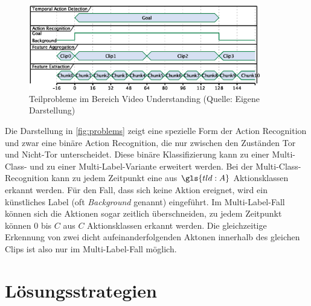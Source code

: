 \begin{figure}[htbp]
    \centering
    \includegraphics[width=0.9\textwidth, height=0.9\textwidth, keepaspectratio, interpolate]{fig/problems.eps}
    \caption[Teilprobleme im Bereich Video Understanding]{Teilprobleme im Bereich Video Understanding (Quelle: Eigene Darstellung)}
    \label{fig:problems}
\end{figure}

Die Darstellung in \autoref{fig:problems} zeigt eine spezielle Form der Action Recognition und zwar eine binäre Action Recognition, die nur zwischen den Zuständen Tor und Nicht-Tor unterscheidet.
Diese binäre Klassifizierung kann zu einer Multi-Class- und zu einer Multi-Label-Variante erweitert werden.
Bei der Multi-Class-Recognition kann zu jedem Zeitpunkt eine aus $\gls{tld:A}$ Aktionsklassen erkannt werden.
Für den Fall, dass sich keine Aktion ereignet, wird ein künstliches Label (oft \emph{Background} genannt) eingeführt.
Im Multi-Label-Fall können sich die Aktionen sogar zeitlich überschneiden, \dh zu jedem Zeitpunkt können $0$ bis $C$ aus $C$ Aktionsklassen erkannt werden.
Die gleichzeitige Erkennung von zwei dicht aufeinanderfolgenden Aktonen innerhalb des gleichen Clips ist also nur im Multi-Label-Fall möglich.


\section{Lösungsstrategien}
\label{sec:loesungsstrategien}

